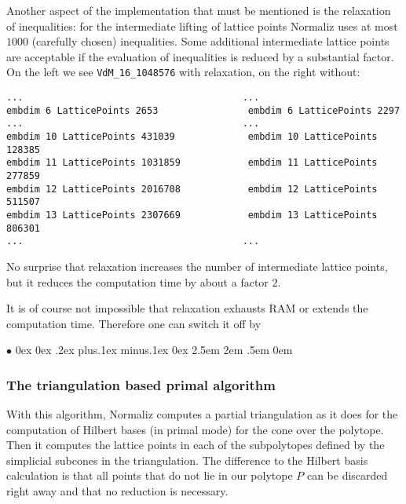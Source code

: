 \documentclass[12pt,a4paper]{scrartcl}
\newcommand{\stdli}{ \topsep0ex \partopsep0ex %
\parsep.2ex plus.1ex minus.1ex \itemsep0ex%
\leftmargin2.5em \labelwidth2em \labelsep.5em \rightmargin0em}%
\renewenvironment{itemize}{\begin{list}{{$\bullet$}}{\stdli}}{\end{list}}
\theoremstyle{definition}
\def\itemtt[#1]{\item[\textbf{\ttt{#1}}]}
\def\ttt{\texttt}
\begin{document}
Another aspect of the implementation that must be mentioned is the relaxation of inequalities: for the intermediate lifting of lattice points Normaliz uses at most $1000$ (carefully chosen) inequalities. Some additional intermediate lattice points are acceptable if the evaluation of inequalities is reduced by a substantial factor. On the left we see \verb|VdM_16_1048576| with relaxation, on the right without:
\begin{Verbatim}
...                                       ...
embdim 6 LatticePoints 2653                embdim 6 LatticePoints 2297
...                                       ...
embdim 10 LatticePoints 431039             embdim 10 LatticePoints 128385
embdim 11 LatticePoints 1031859            embdim 11 LatticePoints 277859
embdim 12 LatticePoints 2016708            embdim 12 LatticePoints 511507
embdim 13 LatticePoints 2307669            embdim 13 LatticePoints 806301
...                                       ...
\end{Verbatim}
No surprise that relaxation increases the number of intermediate lattice points, but it reduces the computation time by about a factor $2$.

It is of course not impossible that relaxation exhausts RAM or extends the computation time. Therefore one can switch it off by
\begin{itemize}
	\itemtt[NoRelax]
\end{itemize}

\subsubsection{The triangulation based primal algorithm}

With this algorithm, Normaliz computes a partial triangulation as it does for the computation of Hilbert bases (in primal mode) for the cone over the polytope. Then it computes the lattice points in each of the subpolytopes defined by the simplicial subcones in the triangulation. The difference to the Hilbert basis calculation is that all points that do not lie in our polytope $P$ can be discarded right away and that no reduction is necessary.
\end{document}
